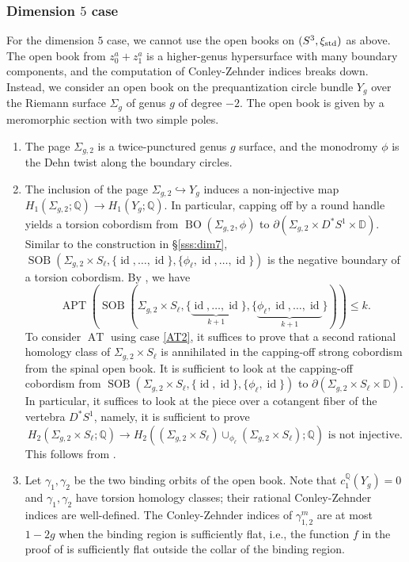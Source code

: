 \documentclass[11pt]{amsart}
\numberwithin{equation}{section}
\def\D{{\mathbb D}}
\def\Q{{\mathbb Q}}
\def\std{\rm std}
\DeclareMathOperator{\Id}{id}
\DeclareMathOperator{\APT}{APT}
\DeclareMathOperator{\AT}{AT}
\DeclareMathOperator{\BO}{BO}
\DeclareMathOperator{\SOB}{SOB}
\begin{document}
\subsubsection{Dimension $5$ case}
For the dimension $5$ case, we cannot use the open books on $(S^3,\xi_{\std})$ as above. The open book from $z^a_0+z_1^a$ is a higher-genus hypersurface with many boundary components, and the computation of Conley-Zehnder indices breaks down. Instead, we consider an open book on the prequantization circle bundle $Y_g$ over the Riemann surface $\Sigma_g$ of genus $g$ of degree $-2$. The open book is given by a meromorphic section with two simple poles. 
\begin{enumerate}
    \item The page $\Sigma_{g,2}$ is a twice-punctured genus $g$ surface, and the monodromy $\phi$ is the Dehn twist along the boundary circles. 
    \item The inclusion of the page $\Sigma_{g,2}\hookrightarrow Y_g$ induces a non-injective map $H_1(\Sigma_{g,2};\Q)\to H_1(Y_g;\Q)$. In particular, capping off by a round handle yields a torsion cobordism from $\BO(\Sigma_{g,2},\phi)$ to $\partial(\Sigma_{g,2}\times D^*S^1 \times \D)$. Similar to the construction in \S \ref{sss:dim7}, $\SOB(\Sigma_{g,2}\times S_{\ell}, \{\Id,\ldots,\Id\}, \{\phi_{\ell},\Id,\ldots,\Id\})$ is the negative boundary of a torsion cobordism. By , we have
    $$\APT(\SOB(\Sigma_{g,2}\times S_{\ell}, \{\underbrace{\Id,\ldots,\Id}_{k+1}\}, \{\underbrace{\phi_{\ell},\Id,\ldots,\Id}_{k+1}\}))\le k.$$ 
    To consider $\AT$ using  case \eqref{AT2}, it suffices to prove that a second rational homology class of $\Sigma_{g,2}\times S_{\ell}$ is annihilated in the capping-off strong cobordism from the spinal open book. It is sufficient to look at the capping-off cobordism from $\SOB(\Sigma_{g,2}\times S_{\ell}, \{\Id,\Id\},\{\phi_{\ell}, \Id\})$ to $\partial(\Sigma_{g,2}\times S_{\ell} \times \D)$. In particular, it suffices to look at the piece over a cotangent fiber of the vertebra $D^*S^1$, namely, it is sufficient to prove 
    $$H_2(\Sigma_{g,2}\times S_{\ell};\Q)\to H_2((\Sigma_{g,2}\times S_{\ell})\cup_{\phi_{\ell}}(\Sigma_{g,2}\times S_{\ell});\Q) \text{ is not injective.}$$
    This follows from .
    \item\label{index} Let $\gamma_1,\gamma_2$ be the two binding orbits of the open book. Note that $c_1^{\Q}(Y_g)=0$ and $\gamma_1,\gamma_2$ have torsion homology classes; their rational Conley-Zehnder indices are well-defined. The Conley-Zehnder indices of $\gamma^m_{1,2}$ are at most $1-2g$ when the binding region is sufficiently flat, i.e., the function $f$ in the proof of  is sufficiently flat outside the collar of the binding region. 

\end{enumerate}
\end{document}
